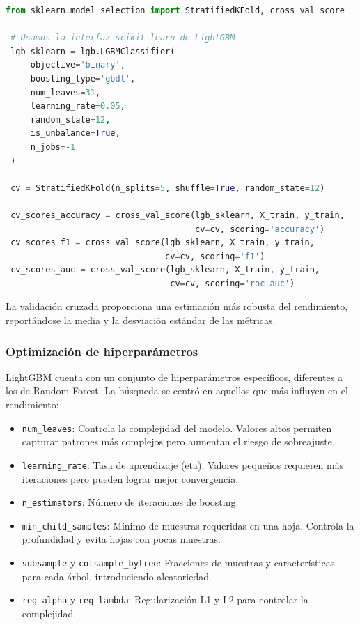  \begin{lstlisting}[language=Python, caption=Validación cruzada con LightGBM]
 from sklearn.model_selection import StratifiedKFold, cross_val_score

 # Usamos la interfaz scikit-learn de LightGBM
 lgb_sklearn = lgb.LGBMClassifier(
     objective='binary',
     boosting_type='gbdt',
     num_leaves=31,
     learning_rate=0.05,
     random_state=12,
     is_unbalance=True,
     n_jobs=-1
 )

 cv = StratifiedKFold(n_splits=5, shuffle=True, random_state=12)

 cv_scores_accuracy = cross_val_score(lgb_sklearn, X_train, y_train, 
                                      cv=cv, scoring='accuracy')
 cv_scores_f1 = cross_val_score(lgb_sklearn, X_train, y_train, 
                                cv=cv, scoring='f1')
 cv_scores_auc = cross_val_score(lgb_sklearn, X_train, y_train, 
                                 cv=cv, scoring='roc_auc')
 \end{lstlisting}

La validación cruzada proporciona una estimación más robusta del rendimiento, reportándose la media y la desviación estándar de las métricas.

\subsubsection*{Optimización de hiperparámetros}

LightGBM cuenta con un conjunto de hiperparámetros específicos, diferentes a los de Random Forest. La búsqueda se centró en aquellos que más influyen en el rendimiento:

\begin{itemize}
    \item \texttt{num\_leaves}: Controla la complejidad del modelo. Valores altos permiten capturar patrones más complejos pero aumentan el riesgo de sobreajuste.
    
    \item \texttt{learning\_rate}: Tasa de aprendizaje (eta). Valores pequeños requieren más iteraciones pero pueden lograr mejor convergencia.
    
    \item \texttt{n\_estimators}: Número de iteraciones de boosting.
    
    \item \texttt{min\_child\_samples}: Mínimo de muestras requeridas en una hoja. Controla la profundidad y evita hojas con pocas muestras.
    
    \item \texttt{subsample} y \texttt{colsample\_bytree}: Fracciones de muestras y características para cada árbol, introduciendo aleatoriedad.
    
    \item \texttt{reg\_alpha} y \texttt{reg\_lambda}: Regularización L1 y L2 para controlar la complejidad.
\end{itemize}


